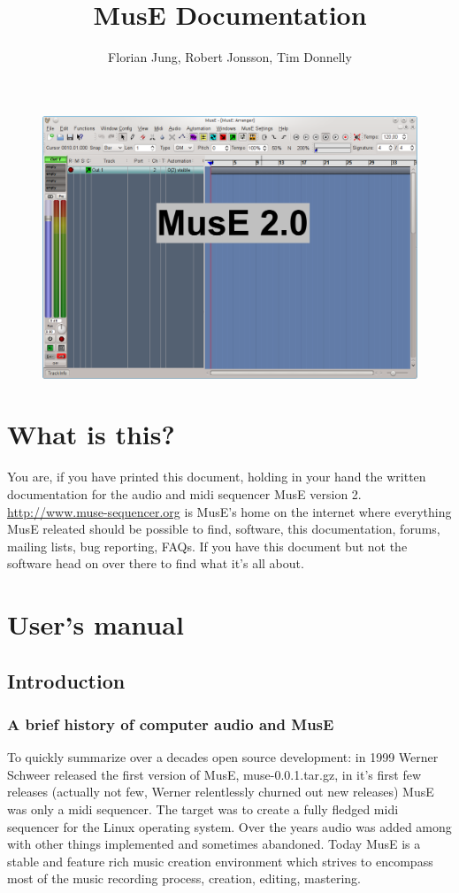 \documentclass[a4paper]{report}
\author{Florian Jung, Robert Jonsson, Tim Donnelly}
\title{MusE Documentation}
\begin{document}
\begin{figure}[htp]
\centering \includegraphics[width=1.0\textwidth]{pics/muse2}
\label{fig:MusE}
\end{figure}
\tableofcontents
\chapter{What is this?}
You are, if you have printed this document, holding in your hand the
written documentation for the audio and midi sequencer MusE version 2.\\ 
\url{http://www.muse-sequencer.org} is MusE's home on the internet where
everything MusE releated should be possible to find, software, this
documentation, forums, mailing lists, bug reporting, FAQs. If you have
this document but not the software head on over there to find what it's
all about.
\chapter{User's manual}

\section{Introduction}
\subsection{A brief history of computer audio and MusE}
To quickly summarize over a decades open source development: in 1999 Werner
 Schweer released the first version of MusE, muse-0.0.1.tar.gz, in it's first
few releases (actually not few, Werner relentlessly churned out new releases)
MusE was only a midi sequencer. The target was to create a fully fledged
midi sequencer for the Linux operating system. Over the years audio was
added among with other things implemented and sometimes abandoned.
Today MusE is a stable and feature rich music creation environment which
strives to encompass most of the music recording process, creation, editing,
mastering.
\end{document}
